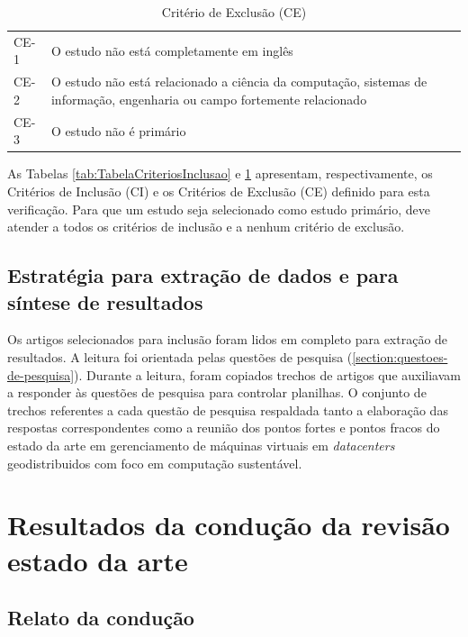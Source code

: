 \documentclass[
	12pt,				%
	oneside,			%
	a4paper,			%
	english,			%
	brazil				%
	]{abntex2ppgsi}
\begin{document}
\begin{apendicesenv}
\begin{table}[htbp]
	\centering
	\caption{Critério de Exclusão (CE)}
		\begin{tabular}{p{1in} p{5in} } \hline

		CE-1	& O estudo não está completamente em inglês \\
		CE-2	& O estudo não está relacionado a ciência da computação, sistemas de informação, engenharia ou campo fortemente relacionado \\
		CE-3	& O estudo não é primário \\ \hline

		\end{tabular}
	\label{tab:TabelaCriteriosExclusao}
\end{table}

As Tabelas \ref{tab:TabelaCriteriosInclusao} e \ref{tab:TabelaCriteriosExclusao} apresentam, respectivamente, os Critérios de Inclusão (CI) e os Critérios de Exclusão (CE) definido para esta verificação. Para que um estudo seja selecionado como estudo primário, deve atender a todos os critérios de inclusão e a nenhum critério de exclusão.

\section{Estratégia para extração de dados e para síntese de resultados}\label{section:estrategia-para-extracao-de-dados-e-para-sintese-de-resultados}

Os artigos selecionados para inclusão foram lidos em completo para extração de resultados. A leitura foi orientada pelas questões de pesquisa (\ref{section:questoes-de-pesquisa}). Durante a leitura, foram copiados trechos de artigos que auxiliavam a responder às questões de pesquisa para controlar planilhas. O conjunto de trechos referentes a cada questão de pesquisa respaldada tanto a elaboração das respostas correspondentes como a reunião dos pontos fortes e pontos fracos do estado da arte em gerenciamento de máquinas virtuais em \textit{datacenters} geodistribuidos com foco em computação sustentável.

\chapter{Resultados da condução da revisão estado da arte}\label{chapter:resultados-conducao-revisao-estado-da-arte}

\section{Relato da condução}\label{section:relato-da-conducao}


\end{apendicesenv}
\end{document}
